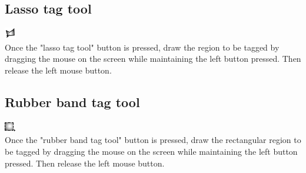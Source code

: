 \subsection{Lasso tag tool} \label{lasso_tag_section}
\includegraphics[scale=0.7]{images/12/lasso.png}\\
Once the "lasso tag tool" button is pressed, draw the region to be tagged by dragging the mouse on the screen while maintaining the left button pressed. Then release the left mouse button. 

\subsection{Rubber band tag tool} \label{rubber_band_tag_section}
\includegraphics[scale=0.7]{images/12/rubber_band.png}\\
Once the "rubber band tag tool" button is pressed, draw the rectangular region to be tagged by dragging the mouse on the screen while maintaining the left button pressed. Then release the left mouse button. 

